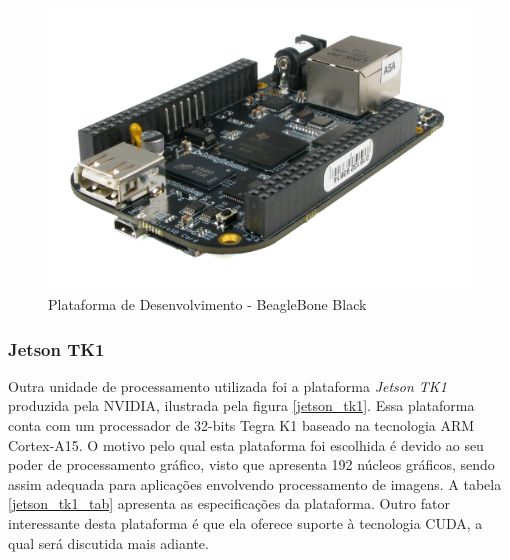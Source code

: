 \begin{figure}[H]
	\centering
	\includegraphics[scale=0.25]{./Resources/bbb.jpg}
	\caption{Plataforma de Desenvolvimento - BeagleBone Black}
	\label{bbb}
\end{figure}


\subsubsection{Jetson TK1}

Outra unidade de processamento utilizada foi a plataforma \textit{Jetson TK1} produzida pela NVIDIA, ilustrada pela figura \ref{jetson_tk1}. Essa plataforma conta com um processador de 32-bits Tegra K1 baseado na tecnologia ARM Cortex-A15. O motivo pelo qual esta plataforma foi escolhida é devido ao seu poder de processamento gráfico, visto que apresenta 192 núcleos gráficos, sendo assim adequada para aplicações envolvendo processamento de imagens. A tabela \ref{jetson_tk1_tab} apresenta as especificações da plataforma. Outro fator interessante desta plataforma é que ela oferece suporte à tecnologia CUDA, a qual será discutida mais adiante.


